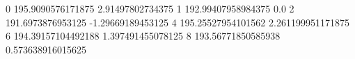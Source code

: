 0 195.9090576171875 2.91497802734375
1 192.99407958984375 0.0
2 191.6973876953125 -1.29669189453125
4 195.25527954101562 2.261199951171875
6 194.39157104492188 1.397491455078125
8 193.56771850585938 0.573638916015625
